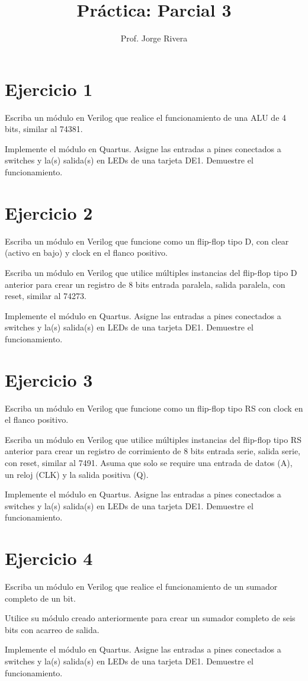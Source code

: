 \documentclass[letterpaper,12pt]{IEEEtran}
\title{Práctica: Parcial 3}
\author{Prof. Jorge Rivera}
\begin{document}
\maketitle

\section*{Ejercicio 1}

Escriba un módulo en Verilog que realice el funcionamiento de una ALU de 4 bits, similar al 74381.

Implemente el módulo en Quartus. Asigne las entradas a pines conectados a switches y la(s) salida(s) en LEDs de una tarjeta DE1. Demuestre el funcionamiento.

\section*{Ejercicio 2}

Escriba un módulo en Verilog que funcione como un flip-flop tipo D, con clear (activo en bajo) y clock en el flanco positivo.

Escriba un módulo en Verilog que utilice múltiples instancias del flip-flop tipo D anterior para crear un registro de 8 bits entrada paralela, salida paralela, con reset, similar al 74273.

Implemente el módulo en Quartus. Asigne las entradas a pines conectados a switches y la(s) salida(s) en LEDs de una tarjeta DE1. Demuestre el funcionamiento.

\newpage



\section*{Ejercicio 3}

Escriba un módulo en Verilog que funcione como un flip-flop tipo RS con clock en el flanco positivo.

Escriba un módulo en Verilog que utilice múltiples instancias del flip-flop tipo RS anterior para crear un registro de corrimiento de 8 bits entrada serie, salida serie, con reset, similar al 7491. Asuma que solo se require una entrada de datos (A), un reloj (CLK) y la salida positiva (Q). 

Implemente el módulo en Quartus. Asigne las entradas a pines conectados a switches y la(s) salida(s) en LEDs de una tarjeta DE1. Demuestre el funcionamiento.

\section*{Ejercicio 4}

Escriba un módulo en Verilog que realice el funcionamiento de un sumador completo de un bit.

Utilice su módulo creado anteriormente para crear un sumador completo de seis bits con acarreo de salida.

Implemente el módulo en Quartus. Asigne las entradas a pines conectados a switches y la(s) salida(s) en LEDs de una tarjeta DE1. Demuestre el funcionamiento.
\end{document}
